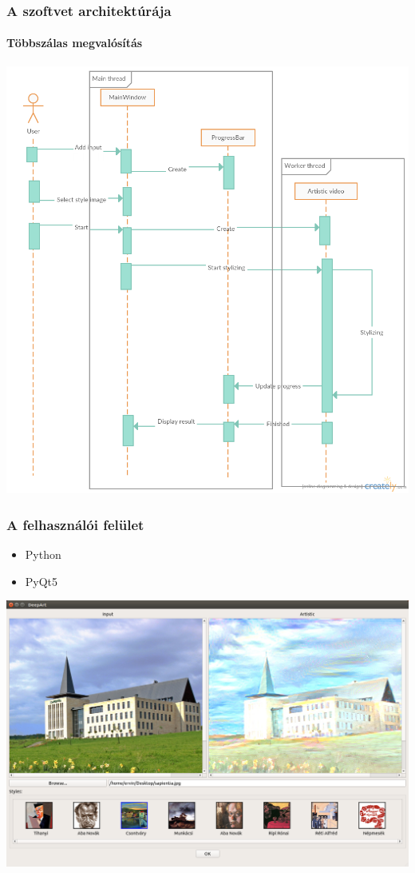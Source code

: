 \documentclass{beamer}
\begin{document}
	\begin{frame}
		\frametitle{A szoftvet architektúrája}
		\framesubtitle{Többszálas megvalósítás}
		\begin{center}
			\includegraphics[scale=0.2]{seq_diagram.png}
		\end{center}
	\end{frame}

	\begin{frame}
		\frametitle{A felhasználói felület}
		\begin{itemize}
			\item Python
			\item PyQt5
		\end{itemize}
		\begin{center}
			\includegraphics[scale=0.18]{main_ui.png}
		\end{center}
	\end{frame}
\end{document}

